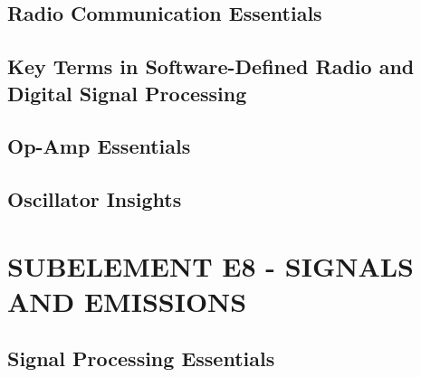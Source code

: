 \documentclass[12pt]{book}
\begin{document}
\section{Radio Communication Essentials}











\section{Key Terms in Software-Defined Radio and Digital Signal Processing}














\section{Op-Amp Essentials}












\section{Oscillator Insights}













\chapter{SUBELEMENT E8 - SIGNALS AND EMISSIONS}
\section{Signal Processing Essentials}











\end{document}
